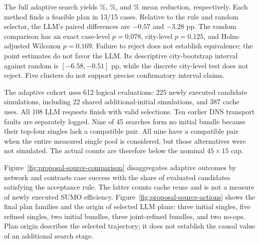 \documentclass[11pt]{article}
\begin{document}
\begin{table}[htbp]\centering\small
\caption{Separate protocol endpoints over the same 15 city--seed cases. Top-10 entries are mean $\pm$ sample SD; global is mean percentage reduction in trip time loss. Evals counts actual logical candidate evaluations, including cache reuse. No-ops remain in the denominator.}\label{tab:main}

\end{table}

The full adaptive search yields \WideLLMTop\%, \WideRuleTop\%, and \WideRandomTop\% mean reduction, respectively. Each method finds a feasible plan in 13/15 cases. Relative to the rule and random selector, the LLM's paired differences are $-0.57$ and $-3.28$ pp. The random comparison has an exact case-level $p=0.078$, city-level $p=0.125$, and Holm-adjusted Wilcoxon $p=0.169$. Failure to reject does not establish equivalence; the point estimates do not favor the LLM. Its descriptive city-bootstrap interval against random is $[-6.58,-0.51]$ pp, while the discrete city-level test does not reject. Five clusters do not support precise confirmatory interval claims.

\begin{table}[htbp]\centering\small
\caption{Paired Top-10 differences. Positive differences favor LLM. Exact sign-flip tests are reported at case and city levels; $p_W$ is Holm-adjusted Wilcoxon within each protocol's two comparisons.}\label{tab:paired}

\end{table}

The adaptive cohort uses 612 logical evaluations: 225 newly executed candidate simulations, including 22 shared additional-initial simulations, and 387 cache uses. All 108 LLM requests finish with valid selections. Ten earlier DNS transport faults are separately logged. Nine of 45 searches form no initial bundle because their top-four singles lack a compatible pair. All nine have a compatible pair when the entire measured single pool is considered, but those alternatives were not simulated. The actual counts are therefore below the nominal $45\times15$ cap.

Figure~\ref{fig:proposal-source-comparison} disaggregates adaptive outcomes by network and contrasts case success with the share of evaluated candidates satisfying the acceptance rule. The latter counts cache reuse and is not a measure of newly executed SUMO efficiency. Figure~\ref{fig:proposal-source-actions} shows the final plan families and the origin of selected LLM plans: three initial singles, five refined singles, two initial bundles, three joint-refined bundles, and two no-ops. Plan origin describes the selected trajectory; it does not establish the causal value of an additional search stage.
\end{document}
